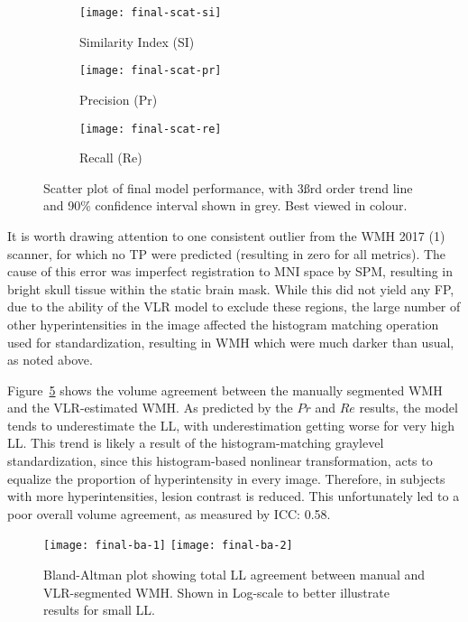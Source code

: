 \begin{figure}
  \centering
  \begin{subfigure}{0.32\textwidth}
    \centering
    \texttt{[image: final-scat-si]}
    \caption{Similarity Index (SI)}%
    \label{fig:seg-final-scat-si}
  \end{subfigure}
  \begin{subfigure}{0.32\textwidth}
    \centering
    \texttt{[image: final-scat-pr]}
    \caption{Precision (Pr)}%
    \label{fig:seg-final-scat-pr}
  \end{subfigure}
  \begin{subfigure}{0.32\textwidth}
    \centering
    \texttt{[image: final-scat-re]}
    \caption{Recall (Re)}%
    \label{fig:seg-final-scat-re}
  \end{subfigure}
  \caption{Scatter plot of final model performance, with 3\ss{rd} order trend line
    and 90\% confidence interval shown in grey. Best viewed in colour.}%
  \label{fig:seg-final-scat}
\end{figure}
It is worth drawing attention to one consistent outlier from the WMH 2017 (1) scanner,
for which no TP were predicted (resulting in zero for all metrics).
The cause of this error was imperfect registration to MNI space by SPM,
resulting in bright skull tissue within the static brain mask.
While this did not yield any FP, due to the ability of the VLR model to exclude these regions,
the large number of other hyperintensities in the image
affected the histogram matching operation used for standardization,
resulting in WMH which were much darker than usual, as noted above.
\par
Figure~\ref{fig:ba-final} shows the volume agreement between
the manually segmented WMH and the VLR-estimated WMH.
As predicted by the $Pr$ and $Re$ results, %
the model tends to underestimate the LL,
with underestimation getting worse for very high LL.
This trend is likely a result of the histogram-matching graylevel standardization,
since this histogram-based nonlinear transformation,
acts to equalize the proportion of hyperintensity in every image.
Therefore, in subjects with more hyperintensities, lesion contrast is reduced.
This unfortunately led to a poor overall volume agreement, as measured by ICC: 0.58.
\par
\begin{figure}
  \centering
  \texttt{[image: final-ba-1]}
  \texttt{[image: final-ba-2]}
  \caption{Bland-Altman plot showing total LL agreement between manual and VLR-segmented WMH.
    Shown in Log-scale to better illustrate results for small LL.}%
  \label{fig:ba-final}
\end{figure}
